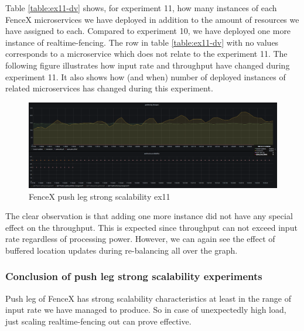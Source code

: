 \documentclass[a4]{report}
\begin{document}
    Table \ref{table:ex11-dv} shows, for experiment 11, how many instances of each FenceX microservices we have
    deployed in addition to the amount of resources we have assigned to each.
    Compared to experiment 10, we have deployed one more instance of realtime-fencing.
    The row in table \ref{table:ex11-dv} with no values corresponds to a microservice which does not relate to the
    experiment 11.
    The following figure illustrates how input rate and throughput have changed during experiment 11.
    It also shows how (and when) number of deployed instances of related microservices has changed during this
    experiment.

    \begin{figure}
        \caption{FenceX push leg strong scalability ex11}
        \label{fig:ex11}
        \includegraphics[scale=0.5]{images/evaluation/ex11-benchmarking-ongoing-2per4sec.png}
    \end{figure}

    \clearpage
    The clear observation is that adding one more instance did not have any special effect on the throughput.
    This is expected since throughput can not exceed input rate regardless of processing power.
    However, we can again see the effect of buffered location updates during re-balancing all over the graph.

    \subsubsection{Conclusion of push leg strong scalability experiments}
    Push leg of FenceX has strong scalability characteristics at least in the range of input rate we have managed to produce.
    So in case of unexpectedly high load, just scaling realtime-fencing out can prove effective.
\end{document}
